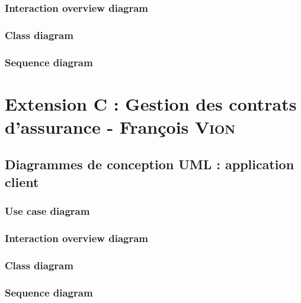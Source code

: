 \documentclass[]{report}
\begin{document}
\newpage

\subsection{Interaction overview diagram}

\newpage

\subsection{Class diagram}

\newpage

\subsection{Sequence diagram}

\newpage






\chapter{Extension C : Gestion des contrats d’assurance - François \textsc{Vion}}



\newpage



\section{Diagrammes de conception UML : application client}



\subsection{Use case diagram}

\newpage

\subsection{Interaction overview diagram}

\newpage

\subsection{Class diagram}

\newpage

\subsection{Sequence diagram}
\end{document}
